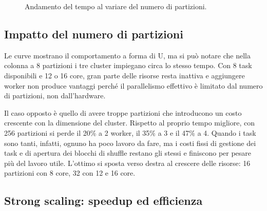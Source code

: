 \documentclass[11pt,a4paper]{article}
\begin{document}
\begin{figure}[h]
\centering
{}
\caption{Andamento del tempo al variare del numero di partizioni.}
\end{figure}

\subsection{Impatto del numero di partizioni}

Le curve mostrano il comportamento a forma di U, ma si può notare che
nella colonna a 8 partizioni i tre cluster impiegano circa lo stesso tempo. 
Con 8 task disponibili e 12 o 16 core, gran parte
delle risorse resta inattiva e aggiungere worker non produce vantaggi perché il parallelismo
effettivo è limitato dal numero di partizioni, non dall'hardware. 

Il caso opposto è quello di avere troppe partizioni che introducono un costo crescente con la dimensione
del cluster.
Rispetto al proprio tempo migliore, con 256 partizioni si perde il 20\% a 2 worker, il 35\% a 3 e il 47\% a 4. 
Quando i task sono tanti, infatti, ognuno ha poco lavoro da fare, ma i costi fissi di gestione dei task e di
apertura dei blocchi di shuffle restano gli stessi e finiscono per pesare più del lavoro utile.
L'ottimo si sposta verso destra al crescere delle risorse: 16 partizioni con
8 core, 32 con 12 e 16 core.

\subsection{Strong scaling: speedup ed efficienza}
\end{document}
